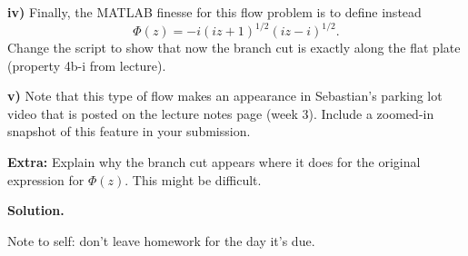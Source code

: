 \documentclass{article}
\begin{document}
\textbf{iv)} Finally, the MATLAB finesse for this flow problem is to
define instead
%
\begin{equation*}
    \Phi(z) = -i (i z + 1)^{1/2} (i z - i)^{1/2}
    .
\end{equation*}
%
Change the script to show that now the branch cut is exactly along the
flat plate (property 4b-i from lecture).

\textbf{v)} Note that this type of flow makes an appearance in
Sebastian's parking lot video that is posted on the lecture notes page
(week 3). Include a zoomed-in snapshot of this feature in your
submission.

\textbf{Extra:} Explain why the branch cut appears where it does for the
original expression for $\Phi(z)$. This might be difficult.

\newpage

\textbf{Solution.}

Note to self: don't leave homework for the day it's due.
\end{document}
